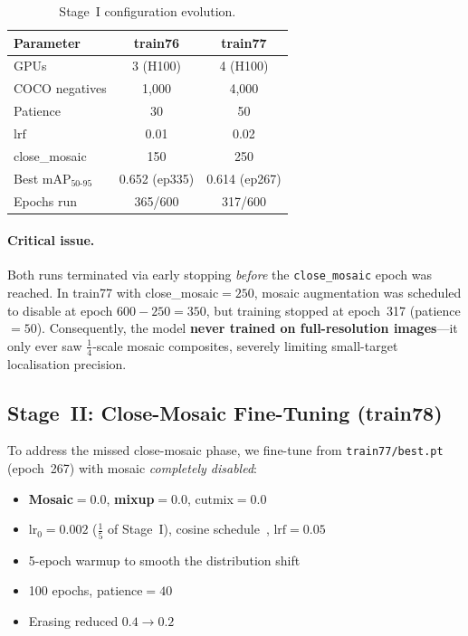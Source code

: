 \documentclass[12pt, titlepage]{article}
\begin{document}
\begin{table}[h]
  \centering
  \caption{Stage~I configuration evolution.}
  \label{tab:stage1}
  \begin{tabular}{@{}lcc@{}}
    \toprule
    \textbf{Parameter}        & \textbf{train76} & \textbf{train77} \\
    \midrule
    GPUs                      & 3 (H100)         & 4 (H100)         \\
    COCO negatives            & 1{,}000          & 4{,}000          \\
    Patience                  & 30               & 50               \\
    $\text{lrf}$              & 0.01             & 0.02             \\
    close\_mosaic             & 150              & 250              \\
    \midrule
    Best mAP$_{50\text{-}95}$ & 0.652 (ep335)    & 0.614 (ep267)    \\
    Epochs run                & 365/600          & 317/600          \\
    \bottomrule
  \end{tabular}
\end{table}

\paragraph{Critical issue.}  Both runs terminated via early stopping \emph{before} the
\texttt{close\_mosaic} epoch was reached. In train77 with close\_mosaic$=250$,
mosaic augmentation was scheduled to disable at epoch $600 - 250 = 350$, but
training stopped at epoch~317 (patience$=50$). Consequently, the model
\textbf{never trained on full-resolution images}---it only ever saw
$\frac{1}{4}$-scale mosaic composites, severely limiting small-target
localisation precision.

\subsection{Stage~II: Close-Mosaic Fine-Tuning (train78)}
\label{sec:stage2}

To address the missed close-mosaic phase, we fine-tune from
\texttt{train77/best.pt} (epoch~267) with mosaic \emph{completely disabled}:

\begin{itemize}[leftmargin=*, itemsep=2pt]
  \item \textbf{Mosaic}$= 0.0$, \textbf{mixup}$= 0.0$, cutmix$= 0.0$
  \item $\text{lr}_0 = 0.002$ ($\frac{1}{5}$ of Stage~I),
        cosine schedule~\citep{loshchilov2016sgdr}, $\text{lrf} = 0.05$
  \item 5-epoch warmup to smooth the distribution shift
  \item 100 epochs, patience$= 40$
  \item Erasing reduced $0.4 \to 0.2$
\end{itemize}
\end{document}
